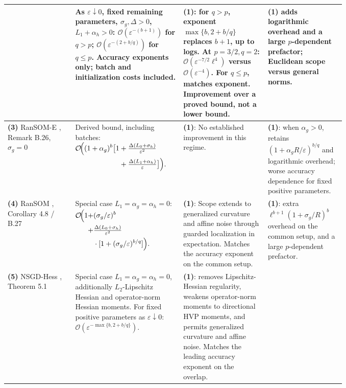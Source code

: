 \begin{table}[tp]
\begin{threeparttable}
\begin{tabularx}{\linewidth}{@{}>{\raggedright\arraybackslash}p{0.20\linewidth}>{\raggedright\arraybackslash}p{0.32\linewidth}>{\raggedright\arraybackslash}p{0.25\linewidth}>{\raggedright\arraybackslash}X@{}}
& As $\varepsilon\downarrow0$, fixed remaining parameters, $\sigma_g,\Delta>0$, $L_1+\alpha_h>0$:
$\mathcal{O}(\varepsilon^{-(b+1)})$ for $q>p$;
$\mathcal{O}(\varepsilon^{-(2+b/q)})$ for $q\le p$.
Accuracy exponents only; batch and initialization costs included.
& \textbf{(1)}: for $q>p$, exponent $\max\{b,2+b/q\}$ replaces $b+1$, up to logs. At $p=3/2,q=2$: $\mathcal{O}(\varepsilon^{-7/2}\ell^4)$ versus $\mathcal{O}(\varepsilon^{-4})$. For $q\le p$, matches exponent. Improvement over a proved bound, not a lower bound.
& \textbf{(1)} adds logarithmic overhead and a large $p$-dependent prefactor; Euclidean scope versus general norms. \\
\midrule
\textbf{(3)} RanSOM-E \citep{gahChaytiFakhouri2026v3}, Remark B.26, $\sigma_g=0$
& Derived bound, including batches:
$\begin{aligned}[t]
\mathcal{O}\!\Bigl((1+\alpha_g)^b\bigl[1
&+\tfrac{\Delta(L_0+\sigma_h)}{\varepsilon^2}\\
&+\tfrac{\Delta(L_1+\alpha_h)}{\varepsilon}\bigr]\Bigr).
\end{aligned}$
& \textbf{(1)}: No established improvement in this regime.
& \textbf{(1)}: when $\alpha_g>0$, retains $(1+\alpha_gR/\varepsilon)^{b/q}$ and logarithmic overhead; worse accuracy dependence for fixed positive parameters. \\
\midrule
\textbf{(4)} RanSOM \citep{gahChaytiFakhouri2026v3}, Corollary 4.8 / B.27
& Special case $L_1=\alpha_g=\alpha_h=0$:
$\begin{aligned}[t]
\mathcal{O}\!\Bigl(1+&(\sigma_g/\varepsilon)^b\\
+{}&\tfrac{\Delta(L_0+\sigma_h)}{\varepsilon^2}\\
&\cdot[1+(\sigma_g/\varepsilon)^{b/q}]\Bigr).
\end{aligned}$
& \textbf{(1)}: Scope extends to generalized curvature and affine noise through guarded localization in expectation. Matches the accuracy exponent on the common setup.
& \textbf{(1)}: extra $\ell^{b+1}(1+\sigma_g/R)^b$ overhead on the common setup, and a large $p$-dependent prefactor. \\
\midrule
\textbf{(5)} NSGD-Hess \citep{mshFradin2026v2}, Theorem 5.1
& Special case $L_1=\alpha_g=\alpha_h=0$, additionally $L_2$-Lipschitz Hessian and operator-norm Hessian moments. For fixed positive parameters as $\varepsilon\downarrow0$:
$\mathcal{O}(\varepsilon^{-\max\{b,2+b/q\}})$.
& \textbf{(1)}: removes Lipschitz-Hessian regularity, weakens operator-norm moments to directional HVP moments, and permits generalized curvature and affine noise. Matches the leading accuracy exponent on the overlap.

\end{tabularx}
\end{threeparttable}
\end{table}
